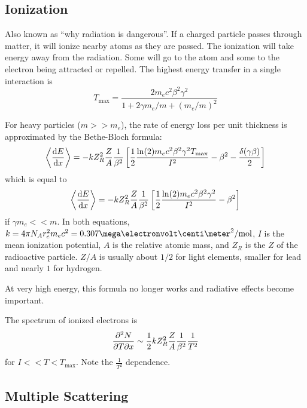 \documentclass[a4paper,twoside,master.tex]{subfiles}
\begin{document}

\subsection{Ionization}
\label{sub:ionization}

Also known as ``why radiation is dangerous''. If a charged particle passes through matter, it will ionize nearby atoms as they are passed. The ionization will take energy away from the radiation. Some will go to the atom and some to the electron being attracted or repelled. The highest energy transfer in a single interaction is
\begin{equation}
    T_{\text{max}} = \frac{2 m_e c^2 \beta^2 \gamma^2}{1 + 2 \gamma m_e / m + (m_e / m)^2}
\end{equation}

For heavy particles ($ m >> m_e $), the rate of energy loss per unit thickness is approximated by the Bethe-Bloch formula:
\begin{equation}
    \ev{\dv{E}{x}} = - k Z^2_R \frac{Z}{A} \frac{1}{\beta^2} \left[ \frac{1}{2} \frac{\ln(2) m_e c^2 \beta^2 \gamma^2 T_{\text{max}}}{I^2} - \beta^2 - \frac{\delta(\gamma \beta)}{2} \right]
\end{equation}
which is equal to
\begin{equation}
    \ev{\dv{E}{x}} = - k Z^2_R \frac{Z}{A} \frac{1}{\beta^2} \left[ \frac{1}{2} \frac{\ln(2) m_e c^2 \beta^2 \gamma^2}{I^2} - \beta^2\right]
\end{equation}
if $ \gamma m_e << m $. In both equations, $ k = 4 \pi N_A r_e^2 m_e c^2 = 0.307\mega\electronvolt \centi\meter^2 /\text{mol} $, $ I $ is the mean ionization potential, $ A $ is the relative atomic mass, and $ Z_R $ is the $ Z $ of the radioactive particle. $ Z/A $ is usually about $ 1/2 $ for light elements, smaller for lead and nearly $ 1 $ for hydrogen.

At very high energy, this formula no longer works and radiative effects become important.

The spectrum of ionized electrons is
\begin{equation}
    \pdv{N}{T}{x} \sim \frac{1}{2} k Z_R^2 \frac{Z}{A} \frac{1}{\beta^2} \frac{1}{T^2}
\end{equation}
for $ I << T < T_{\text{max}} $. Note the $ \frac{1}{T^2} $ dependence.

\subsection{Multiple Scattering}
\label{sub:multiple_scattering}
\end{document}
